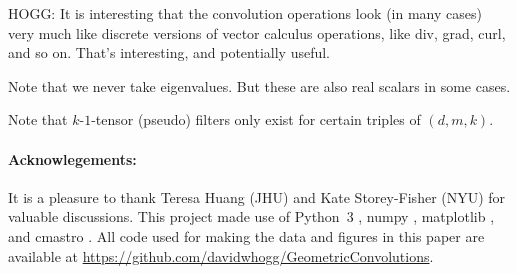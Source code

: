 \documentclass{article}
\theoremstyle{plain}
\begin{document}
HOGG: It is interesting that the convolution operations look (in many cases) very much like discrete versions of vector calculus operations, like div, grad, curl, and so on. That's interesting, and potentially useful.

Note that we never take eigenvalues. But these are also real scalars in some cases.

Note that $k$-$1$-tensor (pseudo) filters only exist for certain triples of $(d, m, k)$.

\paragraph{Acknowlegements:}
It is a pleasure to thank Teresa Huang (JHU) and Kate Storey-Fisher (NYU) for valuable discussions.
This project made use of Python~3 \cite{python3}, numpy \cite{numpy}, matplotlib \cite{matplotlib}, and cmastro \cite{cmastro}.
All code used for making the data and figures in this paper are available at \url{https://github.com/davidwhogg/GeometricConvolutions}.


\raggedright

\end{document}
